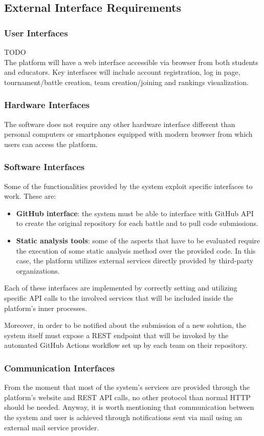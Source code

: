 \subsection{External Interface Requirements}
\subsubsection{User Interfaces}
TODO\\
The platform will have a web interface accessible via browser from both students and educators. Key interfaces will include account registration, log in page, tournament/battle creation, team creation/joining and rankings visualization.
\subsubsection{Hardware Interfaces}
The software does not require any other hardware interface different than personal computers or smartphones equipped with modern browser from which users can access the platform.
\subsubsection{Software Interfaces}
Some of the functionalities provided by the system exploit specific interfaces to work. These are:
\begin{itemize}
    \item \textbf{GitHub interface}: the system must be able to interface with GitHub API to create the original repository for each battle and to pull code submissions.
    \item \textbf{Static analysis tools}: some of the aspects that have to be evaluated require the execution of some static analysis method over the provided code. In this case, the platform utilizes external services directly provided by third-party organizations.
\end{itemize}
Each of these interfaces are implemented by correctly setting and utilizing specific API calls to the involved services that will be included inside the platform’s inner processes.

Moreover, in order to be notified about the submission of a new solution, the system itself must expose a REST endpoint that will be invoked by the automated GitHub Actions workflow set up by each team on their repository.
\subsubsection{Communication Interfaces}
From the moment that most of the system’s services are provided through the platform’s website and REST API calls, no other protocol than normal HTTP should be needed. Anyway, it is worth mentioning that communication between the system and user is achieved through notifications sent via mail using an external mail service provider.

